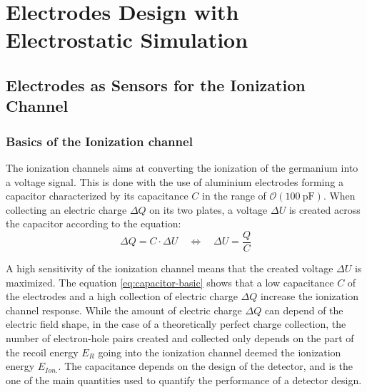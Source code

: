 
\chapter{Electrodes Design with Electrostatic Simulation} %

\label{ChapterElectrodes} %




\section{Electrodes as Sensors for the Ionization Channel}

\subsection{Basics of the Ionization channel}
\label{par:basic-ion-channel}

The ionization channels aims at converting the ionization of the germanium into a voltage signal.
This is done with the use of aluminium electrodes forming a capacitor characterized by its capacitance $C$ in the range of $\mathcal{O}(\SI{100}{\pico\farad})$. When collecting an electric charge $\Delta Q$ on its two plates, a voltage $\Delta U$ is created across the capacitor according to the equation:
\begin{equation}
\Delta Q = C \cdot \Delta U
\quad \Leftrightarrow \quad
\Delta U = \frac{Q}{C}
\label{eq:capacitor-basic}
\end{equation}

A high sensitivity of the ionization channel means that the created voltage $\Delta U$ is maximized. The equation \ref{eq:capacitor-basic} shows that a low capacitance $C$ of the electrodes and a high collection of electric charge $\Delta Q$ increase the ionization channel response. While the amount of electric charge $\Delta Q$ can depend of the electric field shape, in the case of a theoretically perfect charge collection, the number of electron-hole pairs created and collected only depends on the part of the recoil energy $E_R$ going into the ionization channel deemed the ionization energy $E_{Ion.}$.
The capacitance depends on the design of the detector, and is the one of the main quantities used to quantify the performance of a detector design.


